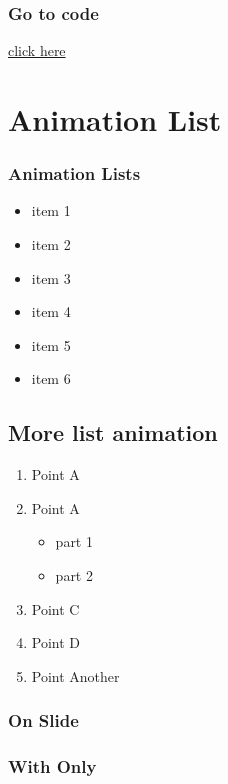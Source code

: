 \documentclass{beamer}
\begin{document}
\begin{frame}
\frametitle{Go to code}
\hyperlink{first}{click here}
\hyperlink{first}{}
\hyperlink{first}{}
\hyperlink{first}{}
\end{frame}

\section{Animation List}
\begin{frame}
\frametitle{Animation Lists}
\begin{itemize}
\item item 1
\pause
\item item 2
\pause
\item item 3
\pause
\item item 4
\pause
\item item 5
\pause
\item item 6
\end{itemize}
\end{frame}

\subsection{More list animation}
\begin{frame}
\begin{enumerate}[I]
\item<1-> Point A 
\item<2-> Point A 
\begin{itemize}
\item<3-> part 1
\item<4-> part 2
\end{itemize}
\item<5-> Point C
\item<6-> Point D
\item<-2,4-5,7> Point Another
\end{enumerate}
\end{frame}

\begin{frame}
\frametitle{On Slide}
\end{frame}


\begin{frame}
\frametitle{With Only}
\end{frame}
\end{document}
